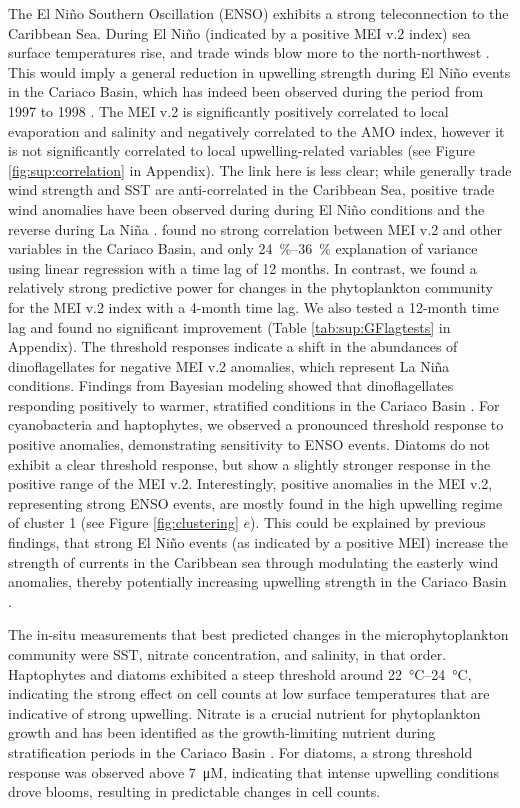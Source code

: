 \documentclass[draft]{agujournal2019}
\begin{document}
    The El Niño Southern Oscillation (ENSO) exhibits a strong teleconnection to the Caribbean Sea. During El Niño (indicated by a positive MEI v.2 index) sea surface temperatures rise, and trade winds blow more to the north-northwest \cite{enfield_tropical_1997}. This would imply a general reduction in upwelling strength during El Niño events in the Cariaco Basin, which has indeed been observed during the period from 1997 to 1998 \cite{romero_seasonal_2009}. The MEI v.2 is significantly positively correlated to local evaporation and salinity and negatively correlated to the AMO index, however it is not significantly correlated to local upwelling-related variables (see Figure \ref{fig:sup:correlation} in Appendix). The link here is less clear; while generally trade wind strength and SST are anti-correlated in the Caribbean Sea, positive trade wind anomalies have been observed during during El Niño conditions and the reverse during La Niña \cite{chang_coupled_2013}.  found no strong correlation between MEI v.2 and other variables in the Cariaco Basin, and only \qtyrange{24}{36}{\%} explanation of variance using linear regression with a time lag of 12 months. In contrast, we found a relatively strong predictive power for changes in the phytoplankton community for the MEI v.2 index with a 4-month time lag. We also tested a 12-month time lag and found no significant improvement (Table \ref{tab:sup:GFlagtests} in Appendix).
    The threshold responses indicate a shift in the abundances of dinoflagellates for negative MEI v.2 anomalies, which represent La Niña conditions. Findings from Bayesian modeling showed that dinoflagellates responding positively to warmer, stratified conditions in the Cariaco Basin \cite{mutshinda_environmental_2013}. For cyanobacteria and haptophytes, we observed a pronounced threshold response to positive anomalies, demonstrating sensitivity to ENSO events. Diatoms do not exhibit a clear threshold response, but show a slightly stronger response in the positive range of the MEI v.2. Interestingly, positive anomalies in the MEI v.2, representing strong ENSO events, are mostly found in the high upwelling regime of cluster 1 (see Figure \ref{fig:clustering} $e$). This could be explained by previous findings, that strong El Niño events (as indicated by a positive MEI) increase the strength of currents in the Caribbean sea through modulating the easterly wind anomalies, thereby potentially increasing upwelling strength in the Cariaco Basin \cite{huang_enso_2023}.
    
    The in-situ measurements that best predicted changes in the microphytoplankton community were SST, nitrate concentration, and salinity, in that order. Haptophytes and diatoms exhibited a steep threshold around \qtyrange{22}{24}{\celsius}, indicating the strong effect on cell counts at low surface temperatures that are indicative of strong upwelling. Nitrate is a crucial nutrient for phytoplankton growth and has been identified as the growth-limiting nutrient during stratification periods in the Cariaco Basin \cite{muller-karger_scientific_2019}. For diatoms, a strong threshold response was observed above \qty{7}{\micro M}, indicating that intense upwelling conditions drove blooms, resulting in predictable changes in cell counts.
    
\end{document}
